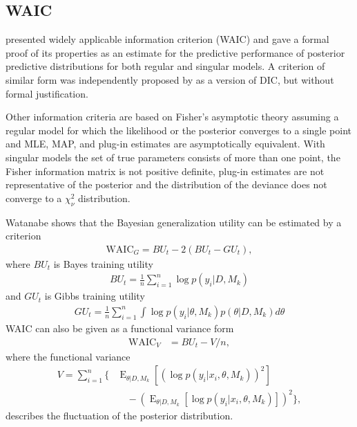 \documentclass[twoside,11pt]{article}
\def\WAIC{\mathrm{WAIC}}
\DeclareMathOperator{\E}{E}
\begin{document}
\subsection{WAIC}

\citet{Watanabe:2009,Watanabe:2010a,Watanabe:2010d} presented
widely applicable information criterion (WAIC) and gave a formal
proof of its properties as an estimate for the predictive
performance of posterior predictive distributions for both regular
and singular models. A criterion of similar form was independently
proposed by \citet{Richardson:2002} as a version of DIC, but
without formal justification.

Other information criteria are based on Fisher's asymptotic theory
assuming a regular model for which the likelihood or the posterior
converges to a single point and MLE, MAP, and plug-in estimates are
asymptotically equivalent. With singular models the set of true
parameters consists of more than one point, the Fisher information 
matrix is not positive definite, plug-in estimates are not
representative of the posterior and the distribution of the deviance
does not converge to a $\chi^2_\nu$ distribution. 

Watanabe shows that the Bayesian generalization utility can
be estimated by a criterion 
\begin{align}
  \WAIC_G = BU_{t} - 2(BU_{t} - GU_{t}),
\end{align}
where $BU_t$ is Bayes training utility
\begin{align}
  BU_t = \frac{1}{n} \sum_{i=1}^n \log p(y_i|D,M_k) 
\end{align}
and $GU_t$ is Gibbs training utility
\begin{align}
  GU_t = \frac{1}{n} \sum_{i=1}^n \int \log
  p(y_i|\theta,M_k)  p(\theta|D,M_k) d\theta
\end{align}
WAIC can also be given as a functional variance form 
\begin{align}
  \WAIC_V &= BU_{t} - V/n,
\end{align}
where the functional variance
\begin{align}
  V = %
  \sum_{i=1}^n \Bigg\{ 
    & \E_{\theta|D,M_k} \left[ \left( 
        \log p({y}_i|{x}_i,\theta,M_k)
      \right)^2 \right] \nonumber \\
    & \quad 
    - \left( 
      \E_{\theta|D,M_k} \left[
        \log p({y}_i|{x}_i,\theta,M_k)
      \right]
    \right)^2
  \Bigg\},
\end{align}
describes the fluctuation of the posterior distribution.
\end{document}

